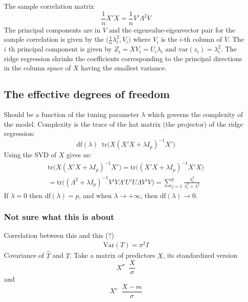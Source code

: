 \documentclass[a4paper]{article}
\newcommand{\ex}{\mathbb{E}}
\newcommand{\tr}{\text{tr}}
\newcommand{\defn}{\mathop{\overset{\Delta}{=}}\nolimits}
\begin{document}
The sample correlation matrix
\[\frac{1}{n} X'X = \frac{1}{n} V'\Lambda^2 V\]
The principal components are in $V$ and the eigenvalue-eigenvector pair for the
sample correlation is given by the $\bigl(\frac{1}{n}\lambda_i^2, V_i\bigr)$
where $V_i$ is the $i$-th column of $V$. The $i$ th principal component is given
by $Z_i = X V_i = U_i \lambda_i$ and $\text{var}(z_i) = \lambda_i^2$. The ridge
regression shrinks the coefficients corresponding to the principal directions in
the column space of $X$ having the smallest variance.



\subsection*{The effective degrees of freedom} %
\label{sub:the_effective_degrees_of_freedom}

Should be a function of the tuning parameter $\lambda$ which governs the complexity
of the model. Complexity is the trace of the hat matrix (the projector) of the ridge regression:
\[\text{df}(\lambda) \defn \tr\bigl(X (X'X + \lambda I_p)^{-1} X'\bigr)\]
Using the SVD of $X$ gives us:
\begin{multline*}
\tr\bigl(X (X'X + \lambda I_p)^{-1} X'\bigr)
= \tr\bigl((X'X + \lambda I_p)^{-1} X'X \bigr) \\
= \tr\bigl( (\Lambda^2 + \lambda I_p)^{-1} V'V\Lambda' U'U\Lambda V'V\bigr)
= \sum_{j=1}^p \frac{\lambda_i^2}{\lambda_i^2 + \lambda^2}
\end{multline*}
If $\lambda = 0$ then $\text{df}(\lambda) = p$, and when $\lambda\to +\infty$,
then $\text{df}(\lambda) \to 0$.


\subsubsection*{Not sure what this is about} %
\label{ssub:not_sure_what_this_is_about}

Correlation between this and this (?)
\begin{align*}
	\text{Var}(T) = \sigma^2 I
\end{align*}
Covariance of $\hat{T}$ and $T$.
Take a matrix of predictors $X$, its standardized version
\[X^\sigma \defn \frac{X}{\sigma}\]
and \[X^c \defn \frac{X-m}{\sigma}\]
\end{document}
